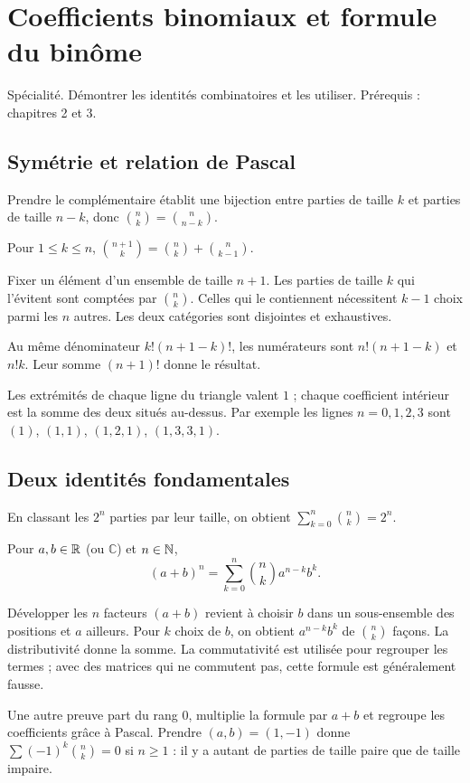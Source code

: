 \documentclass[../cours_tle.tex]{subfiles}
\begin{document}
\setcounter{chapter}{3}
\chapter{Coefficients binomiaux et formule du binôme}
\label{ch:4}
\begin{objectif}
Spécialité. Démontrer les identités combinatoires et les utiliser. Prérequis : chapitres 2 et 3.
\end{objectif}
\section{Symétrie et relation de Pascal}
Prendre le complémentaire établit une bijection entre parties de taille $k$ et parties de taille $n-k$, donc $\binom nk=\binom n{n-k}$.
\begin{theoreme}[Pascal]
Pour $1\le k\le n$, $\binom{n+1}k=\binom nk+\binom n{k-1}$.
\end{theoreme}
\begin{demonstration}[Combinatoire]
Fixer un élément d'un ensemble de taille $n+1$. Les parties de taille $k$ qui l'évitent sont comptées par $\binom nk$. Celles qui le contiennent nécessitent $k-1$ choix parmi les $n$ autres. Les deux catégories sont disjointes et exhaustives.
\end{demonstration}
\begin{demonstration}[Algébrique]
Au même dénominateur $k!(n+1-k)!$, les numérateurs sont $n!(n+1-k)$ et $n!k$. Leur somme $(n+1)!$ donne le résultat.
\end{demonstration}
Les extrémités de chaque ligne du triangle valent $1$ ; chaque coefficient intérieur est la somme des deux situés au-dessus. Par exemple les lignes $n=0,1,2,3$ sont $(1)$, $(1,1)$, $(1,2,1)$, $(1,3,3,1)$.
\section{Deux identités fondamentales}
En classant les $2^n$ parties par leur taille, on obtient
$\sum_{k=0}^n\binom nk=2^n$.
\begin{theoreme}
Pour $a,b\in\mathbb{R}$ (ou $\mathbb C$) et $n\in\mathbb{N}$,
\[
(a+b)^n=\sum_{k=0}^n\binom nk a^{n-k}b^k.
\]
\end{theoreme}
\begin{demonstration}
Développer les $n$ facteurs $(a+b)$ revient à choisir $b$ dans un sous-ensemble des positions et $a$ ailleurs. Pour $k$ choix de $b$, on obtient $a^{n-k}b^k$ de $\binom nk$ façons. La distributivité donne la somme. La commutativité est utilisée pour regrouper les termes ; avec des matrices qui ne commutent pas, cette formule est généralement fausse.
\end{demonstration}
Une autre preuve part du rang $0$, multiplie la formule par $a+b$ et regroupe les coefficients grâce à Pascal.
Prendre $(a,b)=(1,-1)$ donne $\sum(-1)^k\binom nk=0$ si $n\ge1$ : il y a autant de parties de taille paire que de taille impaire.
\end{document}
